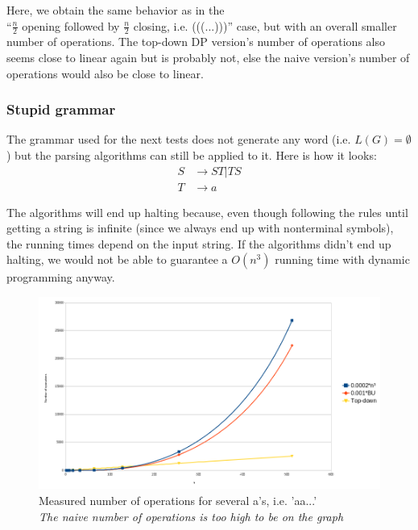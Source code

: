 \documentclass[12pt]{extarticle}
\begin{document}
\begin{multicols}{2}

Here, we obtain the same behavior as in the \\``$\frac n2$ opening followed by $\frac n2$
closing, i.e. (((...)))'' case, but with an overall smaller number of
operations. The top-down DP version's number of operations also seems close to
linear again but is probably not, else the naive version's number of operations
would also be close to linear.

\newpage
\subsubsection{Stupid grammar}
The grammar used for the next tests does not generate any word (i.e.
$L(G)=\emptyset$) but the parsing algorithms can still be applied to it. Here is how it looks:
\begin{align*}
  S&\rightarrow ST|TS\\
  T&\rightarrow a
\end{align*}

The algorithms will end up halting because, even though following the rules until
getting a string is infinite (since we always end up with nonterminal symbols),
the running times depend on the input string. If the algorithms didn't end up halting, we would not be able to guarantee a
$O(n^3)$ running time with dynamic programming anyway.

\end{multicols}
\begin{figure}[h]
  \label{fig:plr}
  \includegraphics[width=\textwidth]{as/as}
  \caption{Measured number of operations for several a's, i.e. 'aa...'\\
    \textit{The naive number of operations is too high to be on
      the graph}}
\end{figure}
\end{document}
